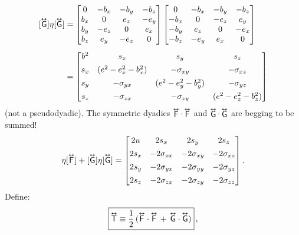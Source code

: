 \documentclass[12pt]{article}
\newcommand{\tightoverset}[2]{%
  \mathop{#2}\limits^{\vbox to -.5ex{\kern-0.75ex\hbox{$#1$}\vss}}}
\newcommand{\inlinedy}[1]{\tightoverset{\text{\tiny$\bm\leftrightarrow$}}{#1}}
\newcommand{\capdy}[1]{ \overset{ \text{\tiny$\bm\leftrightarrow$} }{\vphantom{\text{\small{A}}}\smash{#1}} }
\begin{document}
\begin{equation*}
\begin{aligned}
\mkern0mu [\capdy{\mathsf{G}}] \eta [\capdy{\mathsf{G}}]
&=
\begin{bmatrix}
0 & -b_x & -b_y & -b_z \\
b_x & 0 & e_z & -e_y \\
b_y & -e_z & 0 & e_x \\
b_z & e_y & -e_x & 0
\end{bmatrix}
\begin{bmatrix}
0 & -b_x & -b_y & -b_z \\
-b_x & 0 & -e_z & e_y \\
-b_y & e_z & 0 & -e_x \\
-b_z & -e_y & e_x & 0
\end{bmatrix} \\[5pt]
&=
\begin{bmatrix}
b^2 & s_x & s_y & s_z \\[1ex]
s_x & (e^2 - e_x^2 - b_x^2) & - \sigma_{x y} & - \sigma_{x z} \\[1ex]
s_y & - \sigma_{y x} & (e^2 - e_y^2 - b_y^2)  & - \sigma_{y z} \\[1ex]
s_z & - \sigma_{z x} & - \sigma_{z y} & (e^2 - e_z^2 - b_z^2) 
\end{bmatrix}
\end{aligned}
\end{equation*}
(not a pseudodyadic). The symmetric dyadics $\inlinedy{\mathsf{F}} \cdot \inlinedy{\mathsf{F}}$ and $\inlinedy{\mathsf{G}} \cdot \inlinedy{\mathsf{G}}$ are begging to be summed!
\begin{equation*}
[\capdy{\mathsf{F}}] \eta [\capdy{\mathsf{F}}] + [\capdy{\mathsf{G}}] \eta [\capdy{\mathsf{G}}]
=
\begin{bmatrix}
2 u & 2 s_x & 2 s_y & 2 s_z \\[1ex]
2 s_x & - 2 \sigma_{x x} & - 2 \sigma_{x y} & - 2 \sigma_{x z} \\[1ex]
2 s_y & - 2 \sigma_{y x} & - 2 \sigma_{yy}  & - 2 \sigma_{y z} \\[1ex]
2 s_z & - 2 \sigma_{z x} & - 2 \sigma_{z y} & - 2 \sigma_{zz}
\end{bmatrix}.
\end{equation*}
Define:
\begin{equation}\label{eq:eset}
\boxed { \capdy{\mathsf{T}} \equiv \dfrac{1}{2} \, ( \capdy{\mathsf{F}} \cdot \capdy{\mathsf{F}} \, + \, \capdy{\mathsf{G}} \cdot \capdy{\mathsf{G}} ) } \, ,
\end{equation}
\end{document}
